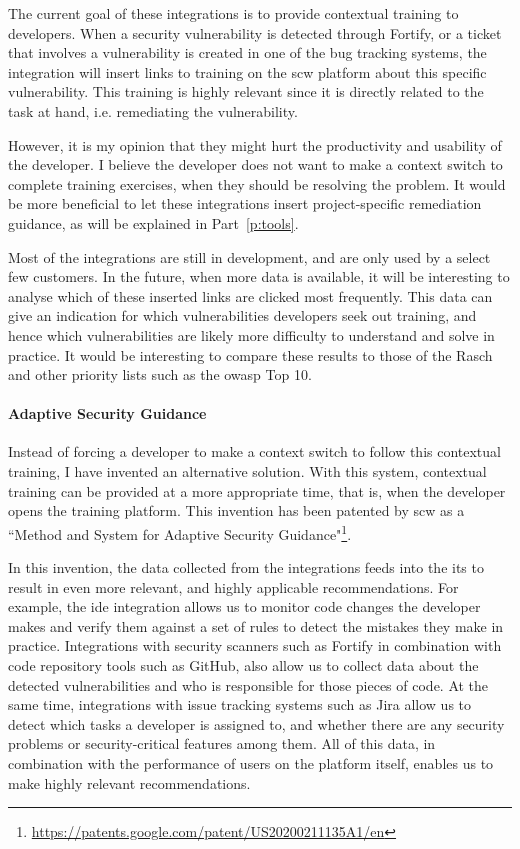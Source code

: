 The current goal of these integrations is to provide contextual training to developers.
When a security vulnerability is detected through Fortify, or a ticket that involves a vulnerability is created in one of the bug tracking systems, the integration will insert links to training on the \gls{scw} platform about this specific vulnerability.
This training is highly relevant since it is directly related to the task at hand, i.e. remediating the vulnerability.

However, it is my opinion that they might hurt the productivity and usability of the developer.
I believe the developer does not want to make a context switch to complete training exercises, when they should be resolving the problem.
It would be more beneficial to let these integrations insert project-specific remediation guidance, as will be explained in Part~\ref{p:tools}.

Most of the integrations are still in development, and are only used by a select few customers.
In the future, when more data is available, it will be interesting to analyse which of these inserted links are clicked most frequently.
This data can give an indication for which vulnerabilities developers seek out training, and hence which vulnerabilities are likely more difficulty to understand and solve in practice.
It would be interesting to compare these results to those of the Rasch and other priority lists such as the \gls{owasp} Top 10.

\paragraph{Adaptive Security Guidance}
Instead of forcing a developer to make a context switch to follow this contextual training, I have invented an alternative solution.
With this system, contextual training can be provided at a more appropriate time, that is, when the developer opens the training platform.
This invention has been patented by \gls{scw} as a ``Method and System for Adaptive Security Guidance"\footnote{\url{https://patents.google.com/patent/US20200211135A1/en}}.

In this invention, the data collected from the integrations feeds into the \gls{its} to result in even more relevant, and highly applicable recommendations.
For example, the \gls{ide} integration allows us to monitor code changes the developer makes and verify them against a set of rules to detect the mistakes they make in practice.
Integrations with security scanners such as Fortify in combination with code repository tools such as GitHub, also allow us to collect data about the detected vulnerabilities and who is responsible for those pieces of code.
At the same time, integrations with issue tracking systems such as Jira allow us to detect which tasks a developer is assigned to, and whether there are any security problems or security-critical features among them.
All of this data, in combination with the performance of users on the platform itself, enables us to make highly relevant recommendations.

